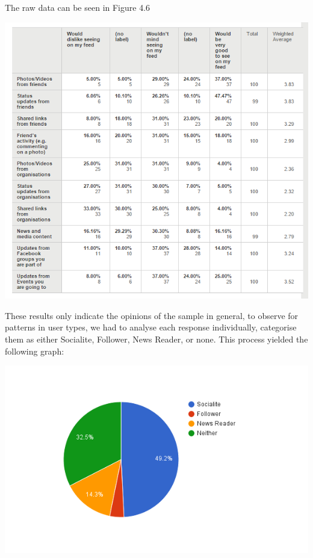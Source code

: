 The raw data can be seen in Figure 4.6

\begin{center}
\includegraphics[scale=0.8]{images/surveyTable.png}
\end{center}

These results only indicate the opinions of the sample in general, to observe for patterns in user types, we had to analyse each response individually, categorise them as either Socialite, Follower, News Reader, or none. This process yielded the following graph:

\begin{center}
\includegraphics[scale=0.8]{images/usermodelChart2.png}
\end{center}

